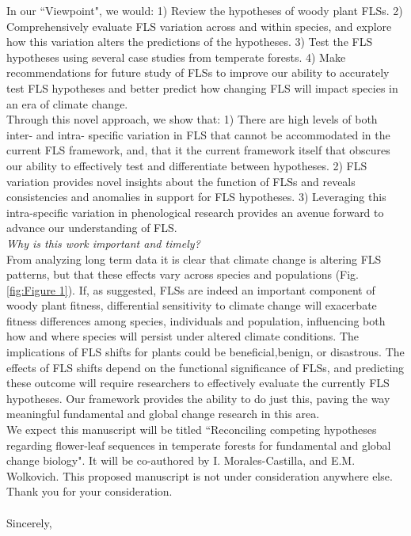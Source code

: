 \documentclass[10.5pt,a4paper]{article}
\begin{document}
\noindent In our ``Viewpoint", we would: 1) Review the hypotheses of woody plant FLSs. 2) Comprehensively evaluate FLS variation across and within species, and explore how this variation alters the predictions of the hypotheses. 3) Test the FLS hypotheses using several case studies from temperate forests. 4)
Make recommendations for future study of FLSs to improve our ability to accurately test FLS hypotheses and better predict how changing FLS will impact species in an era of climate change. \\

\noindent Through this novel approach, we show that: 1) There are high levels of both inter- and intra- specific variation in FLS that cannot be accommodated in the current FLS framework, and, that it the current framework itself that obscures our ability to effectively test and differentiate between hypotheses. 2) FLS variation provides novel insights about the function of FLSs and reveals consistencies and anomalies in support for FLS hypotheses. 3) Leveraging this intra-specific variation in phenological research provides an avenue forward to advance our understanding of FLS.\\

\noindent \emph{Why is this work important and timely?}\\

\noindent From analyzing long term data it is clear that climate change is altering FLS patterns, but that these effects vary across species and populations (Fig. \ref{fig:Figure 1}). If, as suggested, FLSs are indeed an important component of woody plant fitness, differential sensitivity to climate change will exacerbate fitness differences among species, individuals and population, influencing both how and where species will persist under altered climate conditions. The implications of FLS shifts for plants could be beneficial,benign, or disastrous. The effects of FLS shifts depend on the functional significance of FLSs, and predicting these outcome will require researchers to effectively evaluate the currently FLS hypotheses. Our framework provides the ability to do just this, paving the way meaningful fundamental and global change research in this area.\\

 \noindent We expect this manuscript will be titled ``Reconciling competing hypotheses regarding flower-leaf sequences in temperate forests for fundamental and global change biology". It will be co-authored by I. Morales-Castilla, and E.M. Wolkovich. This proposed manuscript is not under consideration anywhere else. Thank you for your consideration.\\
\\Sincerely,\\
\end{document}
